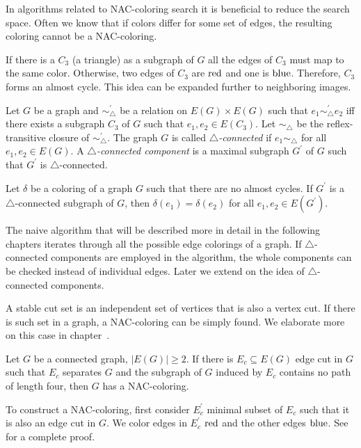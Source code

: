 In algorithms related to NAC-coloring search it is beneficial
to reduce the search space. Often we know that if colors differ for some
set of edges, the resulting coloring cannot be a NAC-coloring.

If there is a \( C_3 \) (a triangle) as a subgraph of \( G \)
all the edges of \( C_3 \) must map to the same color.
Otherwise, two edges of \( C_3 \) are \WLOG{} \( \text{red} \) and one is \( \text{blue} \).
Therefore, \( C_3 \) forms an almost cycle.
This idea can be expanded further to neighboring images.
%
\begin{definition}
	Let \( G \) be a graph and \( \sim^\prime_\triangle \) be
	a relation on \( E(G) \times E(G) \) such that \( e_1 \sim^\prime_\triangle e_2 \)
	iff there exists a subgraph \( C_3 \) of \( G \)
	such that \( e_1, e_2 \in E(C_3) \).
	Let \( \sim_\triangle \) be the reflex-transitive closure of \( \sim^\prime_\triangle \).
	The graph \( G \) is called \emph{\( \triangle \)-connected} if \( e_1 \sim_\triangle \)
	for all \( e_1, e_2 \in E(G) \).
	A \emph{\( \triangle \)-connected component} is a maximal subgraph \( G^\prime \) of \( G \) such
	that \( G^\prime \) is \( \triangle \)-connected.
\end{definition}
%
\begin{lemma}
	Let \( \delta \) be a coloring of a graph \( G \) such that there are
	no almost cycles. If \( G^\prime \) is
	a \( \triangle \)-connected subgraph of \( G \),
	then \( \delta(e_1) = \delta(e_2) \) for all \( e_1, e_2 \in E(G^\prime) \).
\end{lemma}
%
The naive algorithm that will be described more in detail in the following chapters
iterates through all the possible edge colorings of a graph.
If \( \triangle \)-connected components are employed in the algorithm,
the whole components can be checked instead of individual edges.
Later we extend on the idea of \( \triangle \)-connected components.

A stable cut set is an independent set of vertices that is also a vertex cut.
If there is such set in a graph, a NAC-coloring can be simply found.
We elaborate more on this case in chapter~.

%
\begin{lemma}
	Let \( G \) be a connected graph, \( |E(G)| \ge 2 \). If there is \( E_c \subseteq E(G) \)
	edge cut in \( G \) such that \( E_c \) separates \( G \) and the subgraph of \( G \)
	induced by \( E_c \) contains no path of length four, then \( G \) has a NAC-coloring.
\end{lemma}
%
To construct a NAC-coloring, first consider \( E_c^\prime \) minimal subset of \( E_c \)
such that it is also an edge cut in \( G \).
We color edges in \( E_c^\prime \) \( \text{red} \) and the other edges \( \text{blue} \).
See~\cite{legersky_original} for a complete proof.

